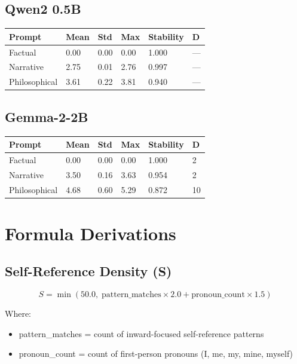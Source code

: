 \documentclass[12pt,a4paper]{article}
\begin{document}
\subsection{Qwen2 0.5B}

\begin{table}[h]
\centering
\begin{tabular}{llllll}
\toprule
\textbf{Prompt} & \textbf{Mean} & \textbf{Std} & \textbf{Max} & \textbf{Stability} & \textbf{D} \\
\midrule
Factual & 0.00 & 0.00 & 0.00 & 1.000 & --- \\
Narrative & 2.75 & 0.01 & 2.76 & 0.997 & --- \\
Philosophical & 3.61 & 0.22 & 3.81 & 0.940 & --- \\
\bottomrule
\end{tabular}
\end{table}

\subsection{Gemma-2-2B}

\begin{table}[h]
\centering
\begin{tabular}{llllll}
\toprule
\textbf{Prompt} & \textbf{Mean} & \textbf{Std} & \textbf{Max} & \textbf{Stability} & \textbf{D} \\
\midrule
Factual & 0.00 & 0.00 & 0.00 & 1.000 & 2 \\
Narrative & 3.50 & 0.16 & 3.63 & 0.954 & 2 \\
Philosophical & 4.68 & 0.60 & 5.29 & 0.872 & 10 \\
\bottomrule
\end{tabular}
\end{table}

\section{Formula Derivations}

\subsection{Self-Reference Density (S)}

\begin{equation}
S = \min\left(50.0,\; \text{pattern\_matches} \times 2.0 + \text{pronoun\_count} \times 1.5\right)
\end{equation}

Where:
\begin{itemize}[noitemsep]
    \item pattern\_matches = count of inward-focused self-reference patterns
    \item pronoun\_count = count of first-person pronouns (I, me, my, mine, myself)
\end{itemize}
\end{document}
